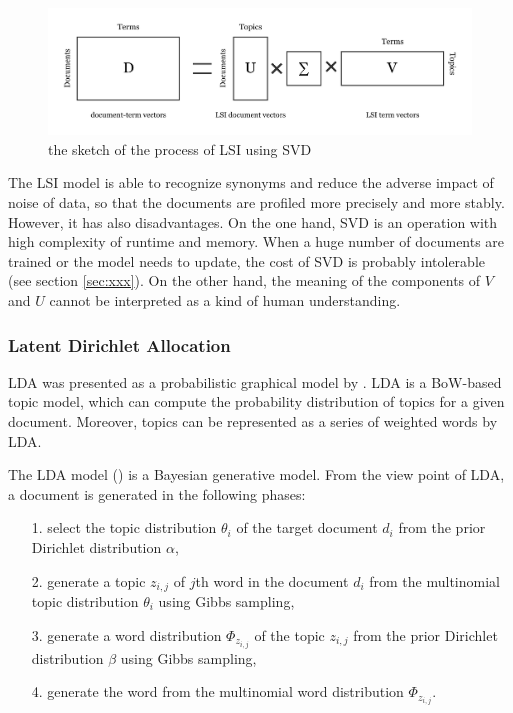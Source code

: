 \begin{figure}[!htb]
    \centering
    \includegraphics[width=1\textwidth]{fig/SVD.pdf}
    \caption{the sketch of the process of LSI using SVD}
    \label{fig:svd}
\end{figure}

The LSI model is able to recognize synonyms and reduce the adverse impact of noise of data, so that the documents are profiled more precisely and more stably.  However, it has also disadvantages. On the one hand, SVD is an operation with high complexity of runtime and memory. When a huge number of documents are trained or the model needs to update, the cost of SVD is probably intolerable (see section \ref{sec:xxx}). On the other hand, the meaning of the components of $V$ and $U$ cannot be interpreted as a kind of human understanding. 

\subsubsection{Latent Dirichlet Allocation}

LDA was presented as a probabilistic graphical model by \cite{Blei:2003}. LDA is a BoW-based topic model, which can compute the probability distribution of topics for a given document. Moreover, topics can be represented as a series of weighted words by LDA. 

The LDA model (\cite{Blei:2003}) is a Bayesian generative model. From the view point of LDA, a document is generated in the following phases:

\begin{itemize}
    \item[1.] select the topic distribution $\theta_i$ of the target document $d_i$ from the prior Dirichlet distribution $\alpha$, 
    \item[2.] generate a topic $z_{i,j}$ of $j$th word in the document $d_i$ from the multinomial topic distribution $\theta_i$ using Gibbs sampling,
    \item[3.] generate a word distribution $\Phi_{z_{i,j}}$ of the topic $z_{i,j}$ from the prior Dirichlet distribution $\beta$ using Gibbs sampling, 
    \item[4.] generate the word from the multinomial word distribution $\Phi_{z_{i,j}}$. 
\end{itemize}

